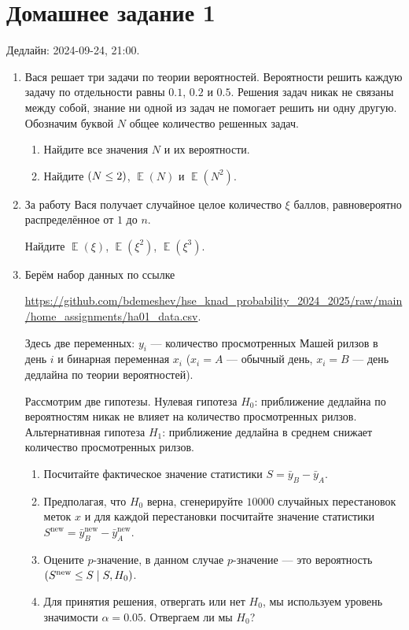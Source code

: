 \documentclass[12pt]{article}
\let\P\relax
\DeclareMathOperator{\P}{\mathbb{P}}
\DeclareMathOperator{\E}{\mathbb{E}}
\begin{document}
\section*{Домашнее задание 1}

Дедлайн: 2024-09-24, 21:00.

\begin{enumerate}
\item Вася решает три задачи по теории вероятностей. 
Вероятности решить каждую задачу по отдельности равны $0.1$, $0.2$ и $0.5$. 
Решения задач никак не связаны между собой, знание ни одной из задач не помогает решить ни одну другую.
Обозначим буквой $N$ общее количество решенных задач. 

\begin{enumerate}
    \item Найдите все значения $N$ и их вероятности. 
    \item Найдите $\P(N \leq 2)$, $\E(N)$ и $\E(N^2)$.
\end{enumerate}

\item За работу Вася получает случайное целое количество $\xi$ баллов, равновероятно распределённое от $1$ до $n$. 

Найдите $\E(\xi)$, $\E(\xi^2)$, $\E(\xi^3)$.

\item Берём набор данных по ссылке 

\url{https://github.com/bdemeshev/hse_knad_probability_2024_2025/raw/main/home_assignments/ha01_data.csv}.

Здесь две переменных: $y_i$ — количество просмотренных Машей рилзов в день $i$ 
и бинарная переменная $x_i$ ($x_i = A$ — обычный день, $x_i = B$ — день дедлайна по теории вероятностей).

Рассмотрим две гипотезы. 
Нулевая гипотеза $H_0$: приближение дедлайна по вероятностям никак не влияет на количество просмотренных рилзов.
Альтернативная гипотеза $H_1$: приближение дедлайна в среднем снижает количество просмотренных рилзов. 

\begin{enumerate}
    \item Посчитайте фактическое значение статистики $S = \bar y_B - \bar y_A$.
    \item Предполагая, что $H_0$ верна, сгенерируйте $10000$ случайных перестановок меток $x$ и для 
    каждой перестановки посчитайте значение статистики $S^{\text{new}} = \bar y_B^{\text{new}} - \bar y_A^{\text{new}}$.
    \item Оцените $p$-значение, в данном случае $p$-значение — это вероятность $\P(S^{\text{new}} \leq S \mid S, H_0)$.
    \item Для принятия решения, отвергать или нет $H_0$, мы используем уровень значимости $\alpha = 0.05$.
    Отвергаем ли мы $H_0$?
\end{enumerate}

\end{enumerate}
\end{document}
